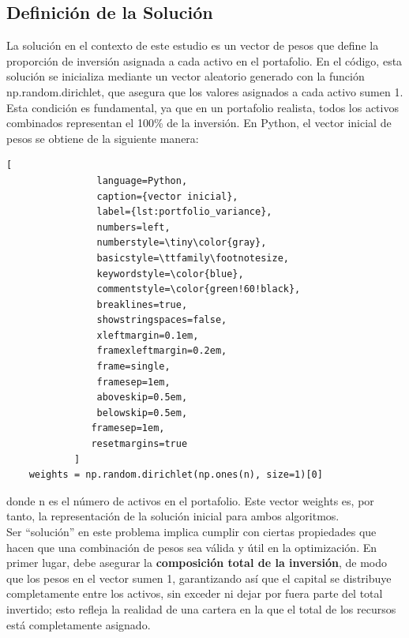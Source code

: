 \documentclass[9pt,a4paper,twoside]{rho-class/rho}
\begin{document}
        \subsection{Definición de la Solución}
            La solución en el contexto de este estudio es un vector de pesos que define la proporción de inversión asignada a cada activo en el portafolio. En el código, esta solución se inicializa mediante un vector aleatorio generado con la función np.random.dirichlet, que asegura que los valores asignados a cada activo sumen 1. Esta condición es fundamental, ya que en un portafolio realista, todos los activos combinados representan el 100\% de la inversión.
            En Python, el vector inicial de pesos se obtiene de la siguiente manera:

            \begin{lstlisting}[
                language=Python,
                caption={vector inicial},
                label={lst:portfolio_variance},
                numbers=left,
                numberstyle=\tiny\color{gray},
                basicstyle=\ttfamily\footnotesize,
                keywordstyle=\color{blue},
                commentstyle=\color{green!60!black},
                breaklines=true,
                showstringspaces=false,
                xleftmargin=0.1em,
                framexleftmargin=0.2em,
                frame=single,
                framesep=1em,
                aboveskip=0.5em,
                belowskip=0.5em,
               framesep=1em,
               resetmargins=true
            ]
    weights = np.random.dirichlet(np.ones(n), size=1)[0]
            \end{lstlisting}
            donde n es el número de activos en el portafolio. Este vector weights es, por tanto, la representación de la solución inicial para ambos algoritmos.\\
            Ser ``solución'' en este problema implica cumplir con ciertas propiedades que hacen que una combinación de pesos sea válida y útil en la optimización. En primer lugar, debe asegurar la \textbf{composición total de la inversión}, de modo que los pesos en el vector sumen 1, garantizando así que el capital se distribuye completamente entre los activos, sin exceder ni dejar por fuera parte del total invertido; esto refleja la realidad de una cartera en la que el total de los recursos está completamente asignado.
\end{document}
